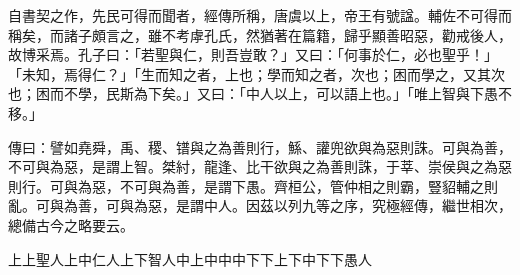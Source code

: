 
\begin{pinyinscope}
自書契之作，先民可得而聞者，經傳所稱，唐虞以上，帝王有號諡。輔佐不可得而稱矣，而諸子頗言之，雖不考虖孔氏，然猶著在篇籍，歸乎顯善昭惡，勸戒後人，故博采焉。孔子曰：「若聖與仁，則吾豈敢？」又曰：「何事於仁，必也聖乎！」「未知，焉得仁？」「生而知之者，上也；學而知之者，次也；困而學之，又其次也；困而不學，民斯為下矣。」又曰：「中人以上，可以語上也。」「唯上智與下愚不移。」

傳曰：譬如堯舜，禹、稷、镨與之為善則行，鯀、讙兜欲與為惡則誅。可與為善，不可與為惡，是謂上智。桀紂，龍逢、比干欲與之為善則誅，于莘、崇侯與之為惡則行。可與為惡，不可與為善，是謂下愚。齊桓公，管仲相之則霸，豎貂輔之則亂。可與為善，可與為惡，是謂中人。因茲以列九等之序，究極經傳，繼世相次，總備古今之略要云。

上上聖人上中仁人上下智人中上中中中下下上下中下下愚人


\end{pinyinscope}